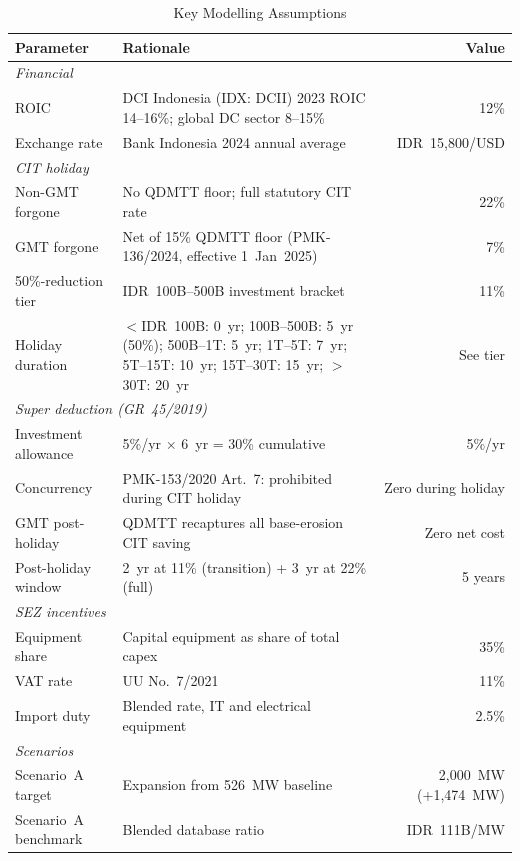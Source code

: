 \documentclass[11pt,english]{article}
\begin{document}
\begin{appendices}
\begin{table}[H]
\centering
\caption{Key Modelling Assumptions}
\begin{threeparttable}
\small
\begin{tabularx}{\textwidth}{l X r}
\toprule
\textbf{Parameter} & \textbf{Rationale} & \textbf{Value} \\
\midrule
\multicolumn{3}{l}{\textit{Financial}} \\[2pt]
ROIC & DCI Indonesia (IDX: DCII) 2023 ROIC 14--16\%; global DC sector 8--15\% & 12\% \\
Exchange rate & Bank Indonesia 2024 annual average & IDR~15{,}800/USD \\[4pt]
\multicolumn{3}{l}{\textit{CIT holiday}} \\[2pt]
Non-GMT forgone & No QDMTT floor; full statutory CIT rate & 22\% \\
GMT forgone & Net of 15\% QDMTT floor (PMK-136/2024, effective 1~Jan~2025) & 7\% \\
50\%-reduction tier & IDR~100B--500B investment bracket & 11\% \\
Holiday duration & $<$IDR~100B: 0~yr; 100B--500B: 5~yr (50\%); 500B--1T: 5~yr; 1T--5T: 7~yr; 5T--15T: 10~yr; 15T--30T: 15~yr; $>$30T: 20~yr & See tier \\[4pt]
\multicolumn{3}{l}{\textit{Super deduction (GR~45/2019)}} \\[2pt]
Investment allowance & 5\%/yr $\times$ 6~yr = 30\% cumulative & 5\%/yr \\
Concurrency & PMK-153/2020 Art.~7: prohibited during CIT holiday & Zero during holiday \\
GMT post-holiday & QDMTT recaptures all base-erosion CIT saving & Zero net cost \\
Post-holiday window & 2~yr at 11\% (transition) + 3~yr at 22\% (full) & 5 years \\[4pt]
\multicolumn{3}{l}{\textit{SEZ incentives}} \\[2pt]
Equipment share & Capital equipment as share of total capex & 35\% \\
VAT rate & UU No.~7/2021 & 11\% \\
Import duty & Blended rate, IT and electrical equipment & 2.5\% \\[4pt]
\multicolumn{3}{l}{\textit{Scenarios}} \\[2pt]
Scenario~A target & Expansion from 526~MW baseline & 2{,}000~MW (+1{,}474~MW) \\
Scenario~A benchmark & Blended database ratio & IDR~111B/MW \\

\end{tabularx}
\end{threeparttable}
\end{table}
\end{appendices}
\end{document}
